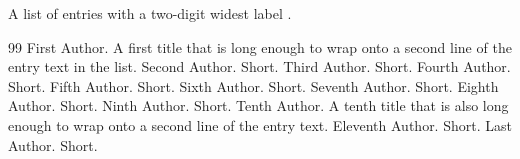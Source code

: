 \documentclass{article}
\begin{document}
A list of entries with a two-digit widest label \cite{e1,e10,e12}.

\begin{thebibliography}{99}
 First Author. A first title that is long enough to wrap onto a second line of the entry text in the list.
 Second Author. Short.
 Third Author. Short.
 Fourth Author. Short.
 Fifth Author. Short.
 Sixth Author. Short.
 Seventh Author. Short.
 Eighth Author. Short.
 Ninth Author. Short.
 Tenth Author. A tenth title that is also long enough to wrap onto a second line of the entry text.
 Eleventh Author. Short.
 Last Author. Short.
\end{thebibliography}
\end{document}
